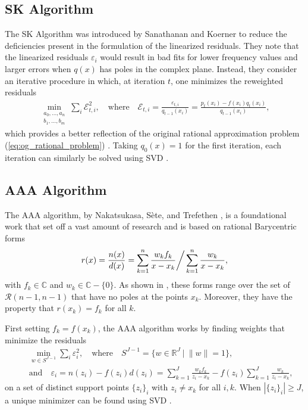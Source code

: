 \documentclass{article}
\begin{document}
\subsection{SK Algorithm}
{The SK Algorithm} was introduced by Sanathanan and Koerner \cite{sk_algorithm} to reduce the deficiencies present in the formulation of the linearized residuals. They note that the linearized residuals $\varepsilon_i$ would result in bad fits for lower frequency values and larger errors when $q(x)$ has poles in the complex plane. Instead, they consider an iterative procedure in which, at iteration $t$, one minimizes the reweighted residuals
\begin{eqnarray}
    \min_{\substack{a_0,\ldots, a_n\\ b_1,\ldots, b_m}}\sum_i \mathcal{E}_{t,i} ^2, \quad \text{where} \quad \mathcal{E}_{t, i} = \frac{\varepsilon_{t, i}}{q_{t-1}(x_i)} = \frac{p_t(x_i) - f(x_i) q_t(x_i)}{q_{t-1}(x_i)},
\end{eqnarray}
which provides a better reflection of the original rational approximation problem (\ref{eq:og_rational_problem}) \cite{stablized_sk_algorithm}. Taking $q_0(x)=1$ for the first iteration, each iteration can similarly be solved using SVD \cite{stablized_sk_algorithm}.

\subsection{AAA Algorithm}
{The AAA algorithm}, by Nakatsukasa, S\`ete, and Trefethen \cite{AAA}, is a foundational work that set off a vast amount of research \cite{barycentric_periodic_functions, barycentric_minmax, aaa_eigenvalue_problems, AAA_Lawson, p_aaa} and is based on rational Barycentric forms
\begin{eqnarray}\label{eq:barycentric_form}
    r(x) = \frac{n(x)}{d(x)} =  \sum_{k=1}^n\frac{w_k f_k}{x - x_k} \bigg{/}\sum_{k=1}^n \frac{w_k}{x - x_k},
\end{eqnarray}
with $f_k\in\mathbb{C}$ and $w_k \in \mathbb{C} - \{0\}$. As shown in \cite{AAA}, these forms range over the set of $\mathcal{R}(n - 1, n - 1)$ that have no poles at the points $x_k$. Moreover, they have the property that $r(x_k) = f_k$ for all $k$. 

First setting $f_k = f(x_k)$, the AAA algorithm works by finding weights that minimize the residuals 
\begin{eqnarray}
    &&\min_{w\in S^{J-1}} \sum_{i}\varepsilon_i^2,\quad \text{where}\quad S^{J-1} = \{w\in\mathbb{R}^{J}\ |\ \|w\| = 1\},\\
    &&\text{and}\quad \varepsilon_i = n(z_i) - f(z_i)d(z_i)= \sum_{k=1}^{J}\frac{w_k f_k}{z_i - x_k} - f(z_i)\sum_{k=1}^{J}\frac{w_k}{z_i - x_k},
\end{eqnarray}
on a set of distinct support points $\{z_i\}_i$ with $z_i \neq x_k$ for all $i, k$. When $|\{z_i\}_i| \geq J$, a unique minimizer can be found using SVD \cite{AAA}.
\end{document}
